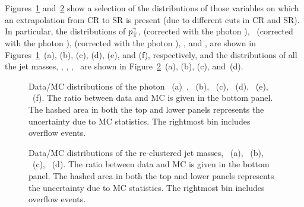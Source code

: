 		Figures~\ref{fig:ttV} and~\ref{fig:ttVMasses} show a selection of the distributions of those variables on which an extrapolation from \ac{CR} to \ac{SR} is present (due to different cuts in \ac{CR} and \ac{SR}). In particular, the distributions of $p_{\mathrm{T}}^{\gamma}$, \mttwo (corrected with the photon \pt), \mtbmin\ (corrected with the photon \pt), \mtbmax (corrected with the photon \pt), \HT, and \drbb, are shown in Figures~\ref{fig:ttV}~(a), (b), (c), (d), (e), and (f), respectively, and the distributions of all the jet masses, \mantikttwelvezero, \mantikttwelveone, \mantikteightzero, \mantikteightone\ are shown in Figure~\ref{fig:ttVMasses}~(a), (b), (c), and~(d).

		\begin{figure}[htbp]
		\centering
		\caption{Data/MC distributions of the photon \pt~(a)~\cite{stop0L}, \mttwo~(b), \mtbmin~(c), \mtbmax~(d), \HT~(e), \drbb~(f). The ratio between data and MC is given in the bottom panel. The hashed area in both the top and lower panels represents the uncertainty due to MC statistics. The rightmost bin includes overflow events.}
		\label{fig:ttV} 
		\end{figure}

		\begin{figure}[htbp]
		\centering
		\caption{Data/MC distributions of the re-clustered jet masses, \mantikttwelvezero~(a), \mantikttwelveone~(b), \mantikteightzero~(c), \mantikteightone~(d). The ratio between data and MC is given in the bottom panel. The hashed area in both the top and lower panels represents the uncertainty due to MC statistics. The rightmost bin includes overflow events.}
		\label{fig:ttVMasses} 
		\end{figure}

